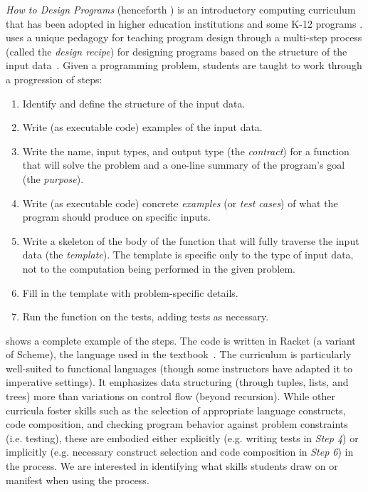 \textit{How to Design Programs} (henceforth \htdp) is an introductory
computing curriculum that has been adopted in higher education institutions and some K-12 programs \cite{felleisen_teachscheme!_2004, ramsey_teaching_2014, bieniusa_htdp_2008}. \htdp uses a unique pedagogy for teaching program design through a multi-step process (called the \emph{design recipe}) for designing programs based on the structure of the input data~\cite{fffk:htdp}.  Given a programming problem, students are taught to work through a progression of steps:

\begin{enumerate}
\item Identify and define the structure of the input data.

\item Write (as executable code) examples of the input data.

\item Write the name, input types, and output type (the
  \emph{contract}) for a function that will solve the problem and a
  one-line summary of the program's goal (the \emph{purpose}).

\item Write (as executable code) concrete \emph{examples} (or \emph{test
    cases}) of what the program should produce on specific
  inputs.

\item Write a skeleton of the body of the function that will fully
  traverse the input data (the \emph{template}). The template is
  specific only to the type of input data, not to the computation
  being performed in the given problem.

\item Fill in the template with problem-specific details.

\item Run the function on the tests, adding tests
  as necessary.

\end{enumerate}

 shows a complete example of the \htdp steps. The code is
written in Racket (a variant of Scheme), the language used in the \htdp textbook~\cite{fffk:htdp}.
The curriculum is particularly well-suited to
functional languages (though some instructors have adapted
it to imperative settings).  It emphasizes data structuring (through
tuples, lists, and trees) more than variations on control flow (beyond
recursion).  While other curricula foster skills such as the selection
of appropriate language constructs, code composition, and checking
program behavior against problem constraints (i.e. testing), these are
embodied either explicitly (e.g. writing tests in \emph{Step 4}) or
implicitly (e.g. necessary construct selection and code composition in
\emph{Step 6}) in the \htdp process.
We are interested in identifying
what skills students draw on or manifest when using the \htdp process.

